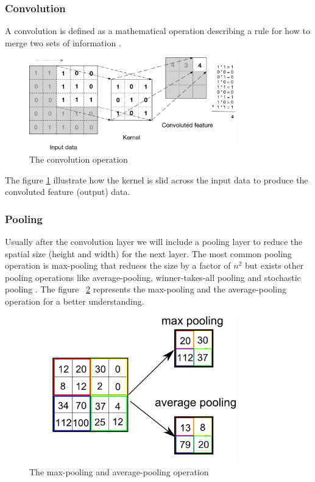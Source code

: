 \subsubsection[Convolution]{Convolution}

A convolution is defined as a mathematical operation describing a rule for how to merge two sets of information \cite{starteddeeplearning}.

\begin{figure}[H]
\centering
\includegraphics[width=0.8\textwidth]{./figures/convolution}
\caption{The convolution operation \cite{rajalingappaa}}
\label{fig:convolution}
\end{figure}

The figure \ref{fig:convolution} illustrate how the kernel is slid across the input data to produce the convoluted feature (output) data. 

\subsubsection[Pooling]{Pooling}

Usually after the convolution layer we will include a pooling layer to reduce the spatial size \cite{starteddeeplearning} (height and width) for the next layer. 
The most common pooling operation is max-pooling that reduces the size by a factor of $n^2$ \cite{greenspan} but exists other pooling operations like average-pooling, winner-takes-all pooling \cite{advancesneuralinformation} and stochastic pooling \cite{stochastic}. The figure ~\ref{fig:pooling} represents the max-pooling and the average-pooling operation for a better understanding.

\begin{figure}[H]
\centering
\includegraphics[width=0.8\textwidth]{./figures/pooling}
\caption{The max-pooling and average-pooling operation \cite{pooling}}
\label{fig:pooling}
\end{figure}

